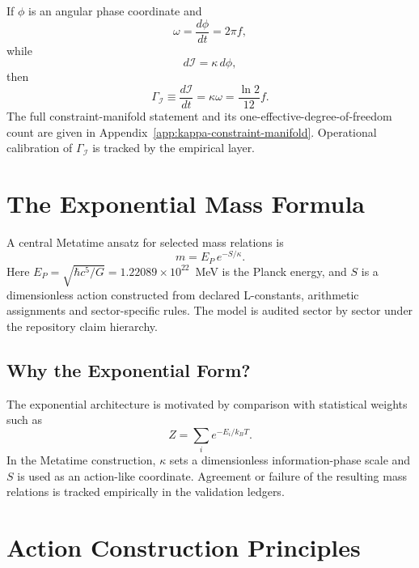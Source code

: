 If $\phi$ is an angular phase coordinate and
\begin{equation}
\omega=\frac{d\phi}{dt}=2\pi f,
\end{equation}
while
\begin{equation}
d\mathcal I=\kappa\,d\phi,
\end{equation}
then
\begin{equation}
\boxed{
\Gamma_{\mathcal I}
\equiv\frac{d\mathcal I}{dt}
=\kappa\omega
=\frac{\ln2}{12}f.
}
\label{eq:metatime_phase_rate_summary}
\end{equation}
The full constraint-manifold statement and its one-effective-degree-of-freedom
count are given in Appendix~\ref{app:kappa-constraint-manifold}. Operational
calibration of $\Gamma_{\mathcal I}$ is tracked by the empirical layer.

\section{The Exponential Mass Formula}

A central Metatime ansatz for selected mass relations is
\begin{equation}
m = E_P \, e^{-S/\kappa}.
\label{eq:mass_formula}
\end{equation}
Here $E_P = \sqrt{\hbar c^5 / G} = 1.22089 \times 10^{22}$~MeV is the Planck
energy, and $S$ is a dimensionless action constructed from declared
L-constants, arithmetic assignments and sector-specific rules. The model is
audited sector by sector under the repository claim hierarchy.


\subsection{Why the Exponential Form?}

The exponential architecture is motivated by comparison with statistical
weights such as
\[
Z = \sum_i e^{-E_i / k_B T}.
\]
In the Metatime construction, $\kappa$ sets a dimensionless information-phase
scale and $S$ is used as an action-like coordinate. Agreement or failure of the
resulting mass relations is tracked empirically in the validation ledgers.

\section{Action Construction Principles}

